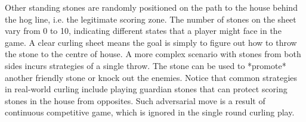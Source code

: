 \documentclass[oneside,11pt,a4paper]{article}
\begin{document}
\newline
\newline
\noindent
Other standing stones are randomly positioned on the path to the house behind the hog line, i.e. the legitimate scoring zone. The number of stones on the sheet vary from 0 to 10, indicating different states that a player might face in the game. A clear curling sheet means the goal is simply to figure out how to throw the stone to the centre of house. A more complex scenario with stones from both sides incurs strategies of a single throw. The stone can be used to *promote* another friendly stone or knock out the enemies. Notice that common strategies in real-world curling include playing guardian stones that can protect scoring stones in the house from opposites. Such adversarial move is a result of continuous competitive game, which is ignored in the single round curling play.
\newline
\newline
\noindent
\end{document}
